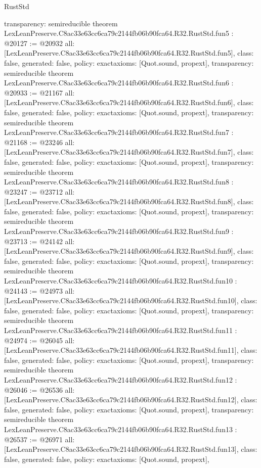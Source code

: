 \begin{lexlean}{RustStd}
\begin{coremodule}
{  transparency: semireducible
}
theorem LexLeanPreserve.C8ac33e63cc6ca79c2144fb06b90fca64.R32.RustStd.fun5 : @20127 := @20932 {
  all: [LexLeanPreserve.C8ac33e63cc6ca79c2144fb06b90fca64.R32.RustStd.fun5],
  class: false,
  generated: false,
  policy: exact{axioms: [Quot.sound, propext]},
  transparency: semireducible
}
theorem LexLeanPreserve.C8ac33e63cc6ca79c2144fb06b90fca64.R32.RustStd.fun6 : @20933 := @21167 {
  all: [LexLeanPreserve.C8ac33e63cc6ca79c2144fb06b90fca64.R32.RustStd.fun6],
  class: false,
  generated: false,
  policy: exact{axioms: [Quot.sound, propext]},
  transparency: semireducible
}
theorem LexLeanPreserve.C8ac33e63cc6ca79c2144fb06b90fca64.R32.RustStd.fun7 : @21168 := @23246 {
  all: [LexLeanPreserve.C8ac33e63cc6ca79c2144fb06b90fca64.R32.RustStd.fun7],
  class: false,
  generated: false,
  policy: exact{axioms: [Quot.sound, propext]},
  transparency: semireducible
}
theorem LexLeanPreserve.C8ac33e63cc6ca79c2144fb06b90fca64.R32.RustStd.fun8 : @23247 := @23712 {
  all: [LexLeanPreserve.C8ac33e63cc6ca79c2144fb06b90fca64.R32.RustStd.fun8],
  class: false,
  generated: false,
  policy: exact{axioms: [Quot.sound, propext]},
  transparency: semireducible
}
theorem LexLeanPreserve.C8ac33e63cc6ca79c2144fb06b90fca64.R32.RustStd.fun9 : @23713 := @24142 {
  all: [LexLeanPreserve.C8ac33e63cc6ca79c2144fb06b90fca64.R32.RustStd.fun9],
  class: false,
  generated: false,
  policy: exact{axioms: [Quot.sound, propext]},
  transparency: semireducible
}
theorem LexLeanPreserve.C8ac33e63cc6ca79c2144fb06b90fca64.R32.RustStd.fun10 : @24143 := @24973 {
  all: [LexLeanPreserve.C8ac33e63cc6ca79c2144fb06b90fca64.R32.RustStd.fun10],
  class: false,
  generated: false,
  policy: exact{axioms: [Quot.sound, propext]},
  transparency: semireducible
}
theorem LexLeanPreserve.C8ac33e63cc6ca79c2144fb06b90fca64.R32.RustStd.fun11 : @24974 := @26045 {
  all: [LexLeanPreserve.C8ac33e63cc6ca79c2144fb06b90fca64.R32.RustStd.fun11],
  class: false,
  generated: false,
  policy: exact{axioms: [Quot.sound, propext]},
  transparency: semireducible
}
theorem LexLeanPreserve.C8ac33e63cc6ca79c2144fb06b90fca64.R32.RustStd.fun12 : @26046 := @26536 {
  all: [LexLeanPreserve.C8ac33e63cc6ca79c2144fb06b90fca64.R32.RustStd.fun12],
  class: false,
  generated: false,
  policy: exact{axioms: [Quot.sound, propext]},
  transparency: semireducible
}
theorem LexLeanPreserve.C8ac33e63cc6ca79c2144fb06b90fca64.R32.RustStd.fun13 : @26537 := @26971 {
  all: [LexLeanPreserve.C8ac33e63cc6ca79c2144fb06b90fca64.R32.RustStd.fun13],
  class: false,
  generated: false,
  policy: exact{axioms: [Quot.sound, propext]},
}
\end{coremodule}
\end{lexlean}
